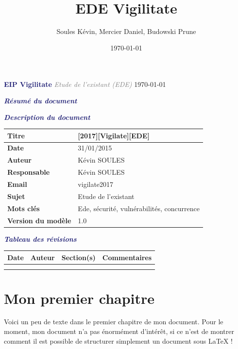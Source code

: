 \documentclass[a4paper,11pt]{report}
\title{EDE Vigilitate}
\author{Soules Kévin, Mercier Daniel, Budowski Prune}
\date{\today}
\begin{document}

\begin{center}\textcolor{MidnightBlue}{\LARGE \textbf{EIP Vigilitate}}\linebreak
{}
\textcolor{gray}{\textit{\Large Etude de l'existant (EDE)}}\linebreak
{}
{\today}\end{center}
\newpage
\textcolor{MidnightBlue}{\textit{\large \textbf{Résumé du document}}}
\newpage
\begin{flushleft}
\textcolor{MidnightBlue}{\textit{\large \textbf{Description du document}}}\linebreak



\begin{tabular}{|>{\columncolor[RGB]{220,220,220}\color{Navy}\bfseries}l|l|}
\hline
Titre & [2017][Vigilate][EDE] \\
\hline
Date & 31/01/2015 \\
\hline
Auteur & Kévin SOULES \\
\hline
Responsable & Kévin SOULES\\
\hline
Email & vigilate2017\\
\hline
Sujet & Etude de l'existant\\
\hline
Mots clés & Ede, sécurité, vulnérabilités, concurrence\\
\hline
Version du modèle & 1.0\\
\hline
\end{tabular}
\bigbreak

\textcolor{MidnightBlue}{\textit{\large \textbf{Tableau des révisions}}}
\bigbreak
\begin{tabular}{|l|l|l|l|}
  \hline
 
   \rowcolor{Gainsboro}Date  & Auteur & Section(s) & Commentaires \\
  \hline
  &  &  & \\
  &  & &  \\
  \hline
\end{tabular}
\end{flushleft}
\tableofcontents
 \thispagestyle{fancy}
\chapter{Mon premier chapitre}
 \thispagestyle{fancy}
    Voici un peu de texte dans le premier chapitre de mon document. Pour le moment, mon document n'a pas énormément d'intérêt, si ce n'est de montrer comment il est possible de structurer simplement un document sous LaTeX !
\end{document}
